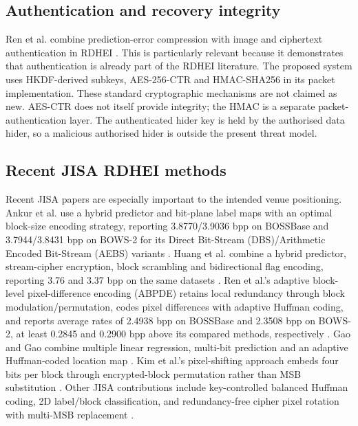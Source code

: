 \documentclass[preprint,12pt,a4paper]{elsarticle}
\begin{document}
\subsection{Authentication and recovery integrity}

Ren et al. combine prediction-error compression with image and ciphertext authentication in RDHEI \cite{ren2025auth}. This is particularly relevant because it demonstrates that authentication is already part of the RDHEI literature. The proposed system uses HKDF-derived subkeys, AES-256-CTR and HMAC-SHA256 in its packet implementation. These standard cryptographic mechanisms are not claimed as new. AES-CTR does not itself provide integrity; the HMAC is a separate packet-authentication layer. The authenticated hider key is held by the authorised data hider, so a malicious authorised hider is outside the present threat model.

\subsection{Recent JISA RDHEI methods}

Recent JISA papers are especially important to the intended venue positioning. Ankur et al. use a hybrid predictor and bit-plane label maps with an optimal block-size encoding strategy, reporting 3.8770/3.9036 bpp on BOSSBase and 3.7944/3.8431 bpp on BOWS-2 for its Direct Bit-Stream (DBS)/Arithmetic Encoded Bit-Stream (AEBS) variants \cite{ankur2025}. Huang et al. combine a hybrid predictor, stream-cipher encryption, block scrambling and bidirectional flag encoding, reporting 3.76 and 3.37 bpp on the same datasets \cite{huang2025bfe}. Ren et al.'s adaptive block-level pixel-difference encoding (ABPDE) retains local redundancy through block modulation/permutation, codes pixel differences with adaptive Huffman coding, and reports average rates of 2.4938 bpp on BOSSBase and 2.3508 bpp on BOWS-2, at least 0.2845 and 0.2900 bpp above its compared methods, respectively \cite{ren2026abpde}. Gao and Gao combine multiple linear regression, multi-bit prediction and an adaptive Huffman-coded location map \cite{gao2025mlr}. Kim et al.'s pixel-shifting approach embeds four bits per block through encrypted-block permutation rather than MSB substitution \cite{kim2024psa}. Other JISA contributions include key-controlled balanced Huffman coding, 2D label/block classification, and redundancy-free cipher pixel rotation with multi-MSB replacement \cite{yang2024kbhc,yang2024label,qu2025rotation}.
\end{document}
